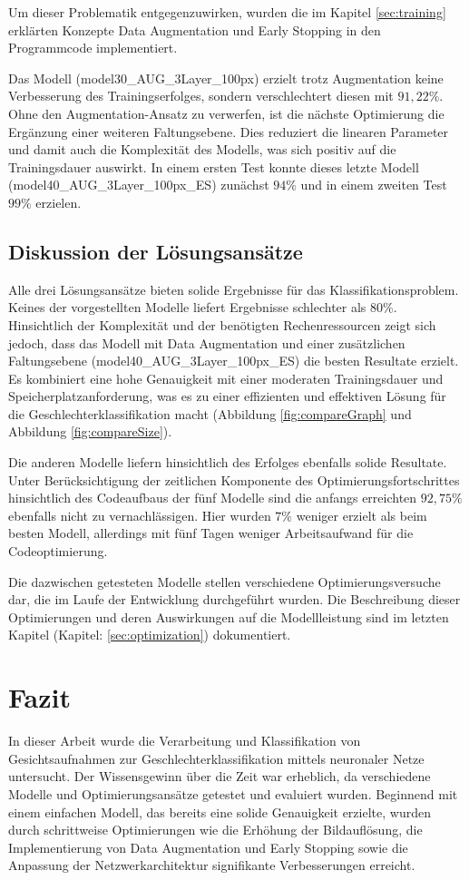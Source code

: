 \documentclass[journal,twoside,web]{ieeecolor}
\begin{document}
Um dieser Problematik entgegenzuwirken, wurden die im Kapitel \ref{sec:training} erklärten Konzepte Data Augmentation und Early Stopping in den Programmcode implementiert.

Das Modell (model30\_AUG\_3Layer\_100px) erzielt trotz Augmentation keine Verbesserung des Trainingserfolges, sondern verschlechtert diesen mit $91,22\%$. 
Ohne den Augmentation-Ansatz zu verwerfen, ist die nächste Optimierung die Ergänzung einer weiteren Faltungsebene. 
Dies reduziert die linearen Parameter und damit auch die Komplexität des Modells, was sich positiv auf die Trainingsdauer auswirkt. 
In einem ersten Test konnte dieses letzte Modell (model40\_AUG\_3Layer\_100px\_ES) zunächst $94\%$ und in einem zweiten Test $99\%$ erzielen.

\subsection{Diskussion der Lösungsansätze}
Alle drei Lösungsansätze bieten solide Ergebnisse für das Klassifikationsproblem. Keines der vorgestellten Modelle liefert Ergebnisse schlechter als $80\%$. Hinsichtlich der Komplexität und der benötigten Rechenressourcen zeigt sich jedoch, dass das Modell mit Data Augmentation und einer zusätzlichen Faltungsebene (model40\_AUG\_3Layer\_100px\_ES) die besten Resultate erzielt. Es kombiniert eine hohe Genauigkeit mit einer moderaten Trainingsdauer und Speicherplatzanforderung, was es zu einer effizienten und effektiven Lösung für die Geschlechterklassifikation macht (Abbildung \ref{fig:compareGraph} und Abbildung \ref{fig:compareSize}).

Die anderen Modelle liefern hinsichtlich des Erfolges ebenfalls solide Resultate. 
Unter Berücksichtigung der zeitlichen Komponente des Optimierungsfortschrittes hinsichtlich des Codeaufbaus der fünf Modelle sind die anfangs erreichten $92,75\%$ ebenfalls nicht zu vernachlässigen. Hier wurden $7\%$ weniger erzielt als beim besten Modell, allerdings mit fünf Tagen weniger Arbeitsaufwand für die Codeoptimierung. 

Die dazwischen getesteten Modelle stellen verschiedene Optimierungsversuche dar, die im Laufe der Entwicklung durchgeführt wurden. Die Beschreibung dieser Optimierungen und deren Auswirkungen auf die Modellleistung sind im letzten Kapitel (Kapitel: \ref{sec:optimization}) dokumentiert.

\section{Fazit}
\label{sec:conclusion}
In dieser Arbeit wurde die Verarbeitung und Klassifikation von Gesichtsaufnahmen zur Geschlechterklassifikation mittels neuronaler Netze untersucht. Der Wissensgewinn über die Zeit war erheblich, da verschiedene Modelle und Optimierungsansätze getestet und evaluiert wurden. Beginnend mit einem einfachen Modell, das bereits eine solide Genauigkeit erzielte, wurden durch schrittweise Optimierungen wie die Erhöhung der Bildauflösung, die Implementierung von Data Augmentation und Early Stopping sowie die Anpassung der Netzwerkarchitektur signifikante Verbesserungen erreicht.
\end{document}
